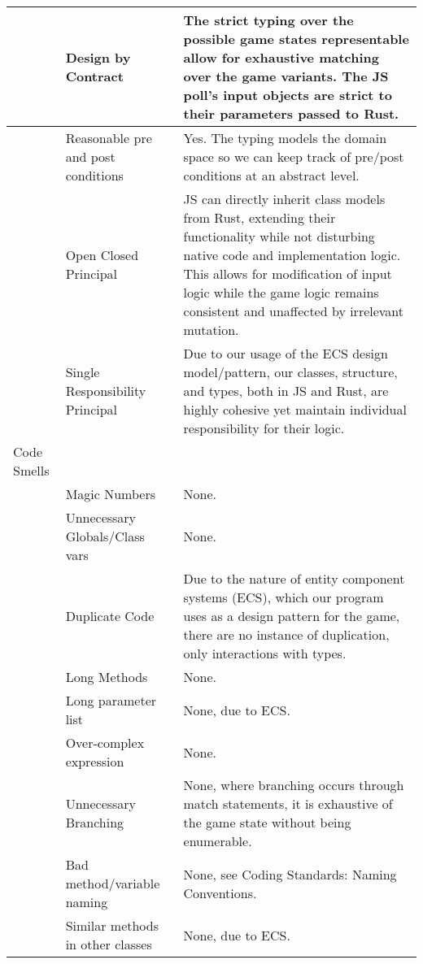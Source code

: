 \documentclass[11pt]{article}
\begin{document}
\begin{longtable}{|m{2.0cm}|m{3.0cm}|m{8.0cm}|}
\hline
 & Design by \newline Contract & The strict typing over the possible game states representable allow for exhaustive matching over the game variants. The JS poll's input objects are strict to their parameters passed to Rust.\\
\hline
 & Reasonable pre and post conditions & Yes. The typing models the domain space so we can keep track of pre/post conditions at an abstract level.\\
\hline
 & Open Closed Principal & JS can directly inherit class models from Rust, extending their functionality while not disturbing native code and implementation logic. This allows for modification of input logic while the game logic remains consistent and unaffected by irrelevant mutation.\\
\hline
 & Single Responsibility Principal & Due to our usage of the ECS design model/pattern, our classes, structure, and types, both in JS and Rust, are highly cohesive yet maintain individual responsibility for their logic.\\
\hline
Code Smells &  & \\
\hline
 & Magic Numbers & None.\\
\hline
 & Unnecessary Globals/Class vars & None.\\
\hline
 & Duplicate Code & Due to the nature of entity component systems (ECS), which our program uses as a design pattern for the game, there are no instance of duplication, only interactions with types.\\
\hline
 & Long Methods & None.\\
\hline
 & Long parameter list & None, due to ECS.\\
\hline
 & Over-complex expression & None.\\
\hline
 & Unnecessary Branching & None, where branching occurs through match statements, it is exhaustive of the game state without being enumerable.\\
\hline
 & Bad method/variable naming & None, see Coding Standards: Naming Conventions.\\
\hline
 & Similar methods in other classes & None, due to ECS.\\
\hline
\end{longtable}
\end{document}
